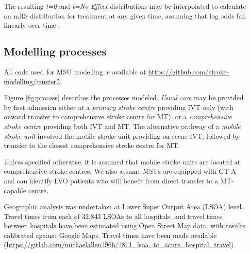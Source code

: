 The resulting \textit{t=0} and \textit{t=No Effect} distributions may be interpolated to calculate an mRS distribution for treatment at any given time, assuming that log odds fall linearly over time \cite{emberson_effect_2014, fransen_time_2016}. 

\subsection{Modelling processes}

All code used for MSU modelling is available at \url{https://github.com/stroke-modelling/muster2}.

Figure \ref{fig:process} describes the processes modeled. \textit{Usual care} may be provided by first admission either at a \textit{primary stroke centre} providing IVT only (with onward transfer to comprehensive stroke centre for MT), or a \textit{comprehensive stroke centre} providing both IVT and MT. The alternative pathway of a \textit{mobile stroke unit} involved the mobile stroke unit providing on-scene IVT, followed by transfer to the closest comprehensive stroke centre for MT.

Unless specified otherwise, it is assumed that mobile stroke units are located at comprehensive stroke centres. We also assume MSUs are equipped with CT-A and can identify LVO patients who will benefit from direct transfer to a MT-capable centre.

Geographic analysis was undertaken at Lower Super Output Area (LSOA) level. Travel times from each of 32,843 LSOAs to all hospitals, and travel times between hospitals have been estimated using Open Street Map data, with results calibrated against Google Maps. Travel times have been made available (\url{https://gitlab.com/michaelallen1966/1811_lsoa_to_acute_hospital_travel}).

